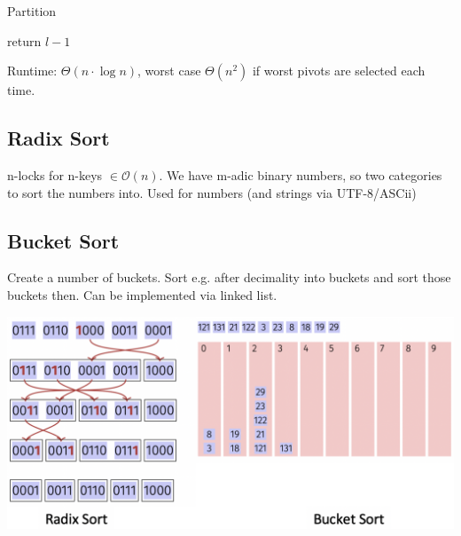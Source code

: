 \documentclass[9pt,landscape,a4paper, table]{extarticle}
\begin{document}
\begin{multicols*}{3}
{\begin{algorithm}[H]
    \SetAlgoLined
\end{algorithm}}

{\scriptsize
\begin{algorithm}[H]
    \caption{Partition}
    
    \SetAlgoLined
    
    return $l-1$
\end{algorithm}}

Runtime: ${\Theta}(n\cdot \log n)$, worst case $\Theta(n^2)$ if worst pivots are selected each time.

\subsection{Radix Sort}
n-locks for n-keys $\in \mathcal{O}(n)$. We have m-adic binary numbers, so two categories to sort the numbers into. Used for numbers (and strings via UTF-8/ASCii)
\subsection{Bucket Sort}
Create a number of buckets. Sort e.g. after decimality into buckets and sort those buckets then. Can be implemented via linked list.


\begin{center}
    \hspace{1cm}\includegraphics[width = 0.6\linewidth]{img/Bucket.png}
\end{center}




\end{multicols*}
\end{document}
